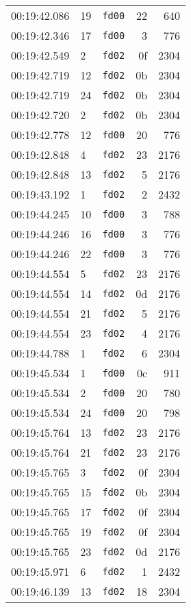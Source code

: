 \documentclass{article}
\begin{document}
\begin{longtable}{lllrr}
00:19:42.086 & 19 & \texttt{fd00} & 22 & 640 \\
00:19:42.346 & 17 & \texttt{fd00} & 3 & 776 \\
00:19:42.549 & 2 & \texttt{fd02} & 0f & 2304 \\
00:19:42.719 & 12 & \texttt{fd02} & 0b & 2304 \\
00:19:42.719 & 24 & \texttt{fd02} & 0b & 2304 \\
00:19:42.720 & 2 & \texttt{fd02} & 0b & 2304 \\
00:19:42.778 & 12 & \texttt{fd00} & 20 & 776 \\
00:19:42.848 & 4 & \texttt{fd02} & 23 & 2176 \\
00:19:42.848 & 13 & \texttt{fd02} & 5 & 2176 \\
00:19:43.192 & 1 & \texttt{fd02} & 2 & 2432 \\
00:19:44.245 & 10 & \texttt{fd00} & 3 & 788 \\
00:19:44.246 & 16 & \texttt{fd00} & 3 & 776 \\
00:19:44.246 & 22 & \texttt{fd00} & 3 & 776 \\
00:19:44.554 & 5 & \texttt{fd02} & 23 & 2176 \\
00:19:44.554 & 14 & \texttt{fd02} & 0d & 2176 \\
00:19:44.554 & 21 & \texttt{fd02} & 5 & 2176 \\
00:19:44.554 & 23 & \texttt{fd02} & 4 & 2176 \\
00:19:44.788 & 1 & \texttt{fd02} & 6 & 2304 \\
00:19:45.534 & 1 & \texttt{fd00} & 0c & 911 \\
00:19:45.534 & 2 & \texttt{fd00} & 20 & 780 \\
00:19:45.534 & 24 & \texttt{fd00} & 20 & 798 \\
00:19:45.764 & 13 & \texttt{fd02} & 23 & 2176 \\
00:19:45.764 & 21 & \texttt{fd02} & 23 & 2176 \\
00:19:45.765 & 3 & \texttt{fd02} & 0f & 2304 \\
00:19:45.765 & 15 & \texttt{fd02} & 0b & 2304 \\
00:19:45.765 & 17 & \texttt{fd02} & 0f & 2304 \\
00:19:45.765 & 19 & \texttt{fd02} & 0f & 2304 \\
00:19:45.765 & 23 & \texttt{fd02} & 0d & 2176 \\
00:19:45.971 & 6 & \texttt{fd02} & 1 & 2432 \\
00:19:46.139 & 13 & \texttt{fd02} & 18 & 2304 \\

\end{longtable}
\end{document}
